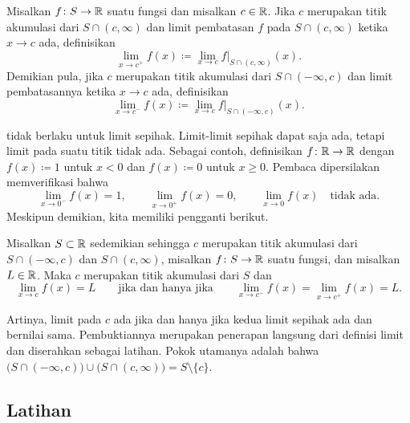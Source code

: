 \begin{defn} \label{defn:onesidedlimits}
Misalkan $f \colon S \to {\mathbb{R}}$ suatu fungsi dan misalkan $c \in {\mathbb{R}}$.  Jika
$c$ merupakan titik akumulasi dari
$S \cap (c,\infty)$
dan limit
pembatasan $f$ pada $S \cap (c,\infty)$
ketika $x \to c$ ada, definisikan
\begin{equation*}
\lim_{x \to c^+} f(x) \coloneqq \lim_{x\to c} f|_{S \cap (c,\infty)}(x) .
\end{equation*}
Demikian pula, jika $c$ merupakan titik akumulasi dari
$S \cap (-\infty,c)$ dan limit pembatasannya ketika $x \to c$
ada, definisikan
\begin{equation*}
\lim_{x \to c^-} f(x) \coloneqq \lim_{x\to c} f|_{S \cap (-\infty,c)}(x) .
\end{equation*}
\end{defn}

 tidak berlaku untuk limit sepihak.
Limit-limit sepihak dapat saja ada, tetapi limit pada suatu titik tidak ada.  Sebagai
contoh, definisikan $f \colon {\mathbb{R}} \to {\mathbb{R}}$ dengan $f(x) \coloneqq 1$ untuk $x < 0$ dan
$f(x) \coloneqq 0$ untuk $x \geq 0$.
Pembaca dipersilakan memverifikasi bahwa
\begin{equation*}
\lim_{x \to 0^-} f(x) = 1, \qquad
\lim_{x \to 0^+} f(x) = 0, \qquad
\lim_{x \to 0} f(x) \quad \text{tidak ada.}
\end{equation*}
Meskipun demikian, kita memiliki pengganti berikut.

\begin{prop} \label{prop:onesidedlimits}
Misalkan $S \subset {\mathbb{R}}$ sedemikian sehingga $c$ merupakan titik akumulasi
dari $S \cap (-\infty,c)$ dan $S \cap (c,\infty)$, misalkan
$f \colon S \to {\mathbb{R}}$ suatu fungsi, dan misalkan $L \in {\mathbb{R}}$.  Maka $c$ merupakan titik akumulasi dari $S$ dan
\begin{equation*}
\lim_{x \to c} f(x) = L
\qquad \text{jika dan hanya jika} \qquad
\lim_{x \to c^-} f(x) =
\lim_{x \to c^+} f(x) =
L .
\end{equation*}
\end{prop}

Artinya, limit pada $c$ ada jika dan hanya jika kedua limit sepihak ada dan bernilai sama.  Pembuktiannya
merupakan penerapan langsung dari definisi limit
dan diserahkan sebagai latihan.  Pokok utamanya adalah bahwa
$\bigl( S \cap (-\infty,c) \bigr) \cup \bigl( S \cap (c,\infty) \bigr)
= S \setminus \{ c \}$.

\subsection{Latihan}

